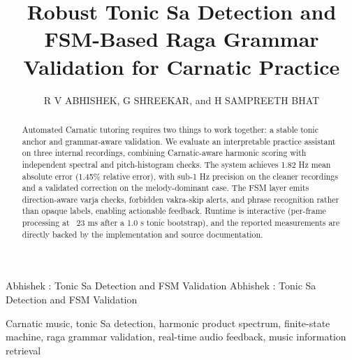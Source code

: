 \documentclass{ieeeaccess}
\begin{document}

\title{Robust Tonic Sa Detection and FSM-Based Raga Grammar Validation for Carnatic Practice}

\author{\uppercase{R V Abhishek},
\uppercase{G Shreekar}, and
\uppercase{H Sampreeth Bhat}}

\address[1]{Department of Computer Science, BMS College of Engineering, Bengaluru, India (e-mail: rvabhishek.cd23@bmsce.ac.in)}
\address[2]{Department of Computer Science, BMS College of Engineering, Bengaluru, India (e-mail: gshreekar.cd23@bmsce.ac.in)}
\address[3]{Department of Computer Science, BMS College of Engineering, Bengaluru, India (e-mail: hsampreeth.cd23@bmsce.ac.in)}

\markboth
{Abhishek \headeretal: Tonic Sa Detection and FSM Validation}
{Abhishek \headeretal: Tonic Sa Detection and FSM Validation}


\begin{abstract}
Automated Carnatic tutoring requires two things to work together: a stable tonic anchor and grammar-aware validation. We evaluate an interpretable practice assistant on three internal recordings, combining Carnatic-aware harmonic scoring with independent spectral and pitch-histogram checks. The system achieves 1.82 Hz mean absolute error (1.45\% relative error), with sub-1 Hz precision on the cleaner recordings and a validated correction on the melody-dominant case. The FSM layer emits direction-aware varja checks, forbidden vakra-skip alerts, and phrase recognition rather than opaque labels, enabling actionable feedback. Runtime is interactive (per-frame processing at ~23 ms after a 1.0 s tonic bootstrap), and the reported measurements are directly backed by the implementation and source documentation.
\end{abstract}

\begin{keywords}
Carnatic music, tonic Sa detection, harmonic product spectrum, finite-state machine, raga grammar validation, real-time audio feedback, music information retrieval
\end{keywords}

\titlepgskip=-15pt
\maketitle
\end{document}
